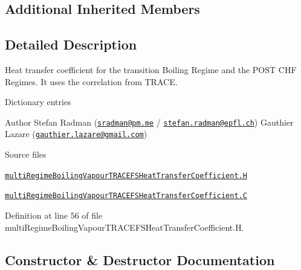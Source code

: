 \subsection*{Additional Inherited Members}


\subsection{Detailed Description}
Heat transfer coefficient for the transition Boiling Regime and the P\+O\+ST C\+HF Regimes. It uses the correlation from T\+R\+A\+CE. 

\label{_Description}%
 Dictionary entries

Author Stefan Radman (\href{mailto:sradman@pm.me}{\tt sradman@pm.\+me} / \href{mailto:stefan.radman@epfl.ch}{\tt stefan.\+radman@epfl.\+ch}) Gauthier Lazare (\href{mailto:gauthier.lazare@gmail.com}{\tt gauthier.\+lazare@gmail.\+com})

\begin{DoxyParagraph}{Source files}

\begin{DoxyItemize}
\item \href{../../../home/carlo/data/GeN-Foam/GeN-Foam_ffn/GeN-Foam/GeN-Foam/classes/thermalHydraulics/src/physicsModels/heatTransferModels/FSHeatTransferCoefficientModels/multiRegimeBoilingVapourTRACE/multiRegimeBoilingVapourTRACEFSHeatTransferCoefficient.H}{\tt multi\+Regime\+Boiling\+Vapour\+T\+R\+A\+C\+E\+F\+S\+Heat\+Transfer\+Coefficient.\+H} 
\item \href{../../../home/carlo/data/GeN-Foam/GeN-Foam_ffn/GeN-Foam/GeN-Foam/classes/thermalHydraulics/src/physicsModels/heatTransferModels/FSHeatTransferCoefficientModels/multiRegimeBoilingVapourTRACE/multiRegimeBoilingVapourTRACEFSHeatTransferCoefficient.C}{\tt multi\+Regime\+Boiling\+Vapour\+T\+R\+A\+C\+E\+F\+S\+Heat\+Transfer\+Coefficient.\+C} 
\end{DoxyItemize}
\end{DoxyParagraph}


Definition at line 56 of file multi\+Regime\+Boiling\+Vapour\+T\+R\+A\+C\+E\+F\+S\+Heat\+Transfer\+Coefficient.\+H.



\subsection{Constructor \& Destructor Documentation}
\mbox{\label{classFoam_1_1FSHeatTransferCoefficientModels_1_1multiRegimeBoilingVapourTRACE_a3f94087f35dc4722725e34316ee9d2c8}} 
